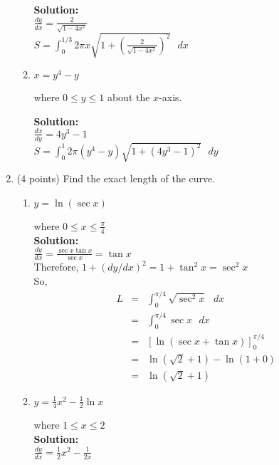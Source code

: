\documentclass[paper=a4, fontsize=11pt]{scrartcl} %
\numberwithin{equation}{section} %
\numberwithin{figure}{section} %
\numberwithin{table}{section} %
\begin{document}
\begin{enumerate}
\begin{enumerate}
\noindent\textbf{Solution:}\\
$\frac{dy}{dx}=\frac{2}{\sqrt{1-4x^2}}$ \\
$S=\int_0^{1/3} 2 \pi x \sqrt{1+\left(\frac{2}{\sqrt{1-4x^2}}\right)^2}\text{  }dx$
\vspace{.5in}
\item \begin{large}$x=y^4-y$\end{large} where $0 \le y \le 1$ about the $x$-axis.

\noindent\textbf{Solution:}\\
$\frac{dx}{dy}=4y^3-1$ \\
$S=\int_0^{1} 2 \pi (y^4-y) \sqrt{1+\left(4y^3-1\right)^2}\text{  }dy$

\end{enumerate}

\newpage
\item (4 points) Find the exact length of the curve.
\begin{enumerate}
\item \begin{large}$y=\ln (\sec x)$\end{large} where $0 \le x \le \frac{\pi}{4}$\\

\noindent\textbf{Solution:}\\
$\frac{dy}{dx}=\frac{\sec x \tan x}{\sec x} = \tan x$\\

Therefore, $1+(dy/dx)^2 = 1 + \tan^2 x = \sec ^2 x$ \\

So, 
\begin{eqnarray*}
L &=& \int_0^{\pi/4} \sqrt{ \sec ^2 x} \text{ } dx \\
&=& \int_0^{\pi/4} \sec x \text{ } dx  \\
&=& \left[ \ln (\sec x + \tan x) \right]_0^{\pi/4}  \\
&=& \ln (\sqrt{2} + 1)- \ln (1+0)  \\
&=& \ln (\sqrt{2} + 1)
\end{eqnarray*}

\vspace{.25in}
\item \begin{large}$y=\frac{1}{4}x^2-\frac{1}{2} \ln x$\end{large} where $1 \le x \le 2$\\

\noindent\textbf{Solution:}\\
$\frac{dy}{dx}=\frac{1}{2}x^2-\frac{1}{2x}$ \\


\end{enumerate}
\end{enumerate}
\end{document}
